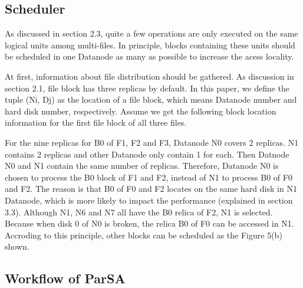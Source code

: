 \documentclass[preprint,12pt]{elsarticle}
\begin{document}
\subsection{Scheduler}
As discussed in section 2.3, quite a few operations are only executed on the same logical units among multi-files. In principle, blocks 
containing these units should be scheduled in one Datanode as many as possible to increase the acess locality. \par
At first, information about file distribution should be gathered. As discussion in section 2.1, file block has three replicas by default. 
In this paper, we define the tuple (Ni, Dj) as the location of a file block, which means Datanode number and hard disk number, respectively. 
Assume we get the following block location information for the first file block of all three files. \par
For the nine replicas for B0 of F1, F2 and F3, Datanode N0 covers 2 replicas. N1 contains 2 replicas and other Datanode only contain 1 for 
each. Then Datnode N0 and N1 contain the same number of replicas. Therefore, Datanode N0 is chosen to process the B0 block of F1 and F2,
instead of N1 to process B0 of F0 and F2. The reason is that B0 of F0 and F2 locates on the same hard disk in N1 Datanode, which is more 
likely to impact the performance (explained in section 3.3). Although N1, N6 and N7 all have the B0 relica of F2, N1 is selected. 
Because when disk 0 of N0 is broken, the relica B0 of F0 can be accessed in N1. Accroding to this principle, other blocks can be scheduled
as the Figure 5(b) shown.

\subsection{Workflow of ParSA}
 

	




\begin{thebibliography}{00}



\end{thebibliography}
\end{document}
